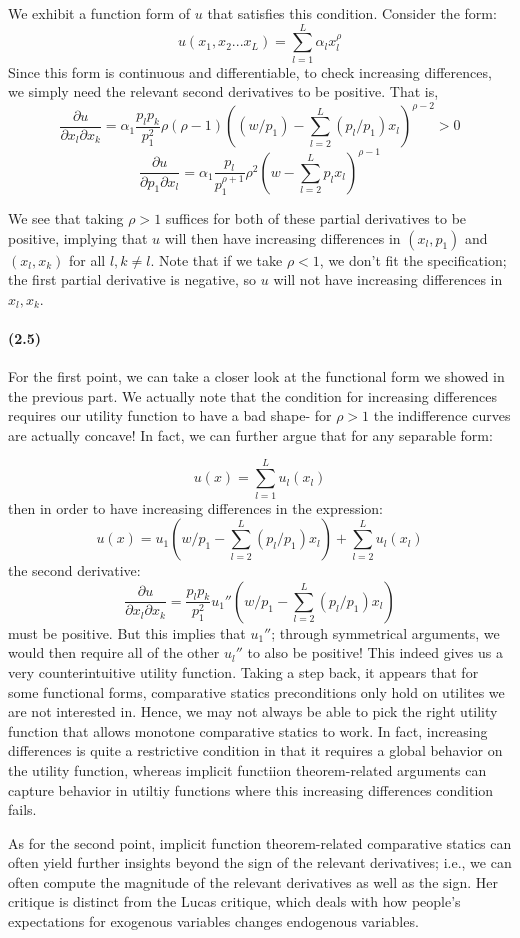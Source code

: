 \documentclass[10pt,letter]{article}
\begin{document}
We exhibit a function form of $u$ that satisfies this condition. Consider the form:
\[ u(x_1, x_2 ... x_L) = \sum_{l=1}^L \alpha_l x_l^\rho \]
Since this form is continuous and differentiable, to check increasing differences, we simply need the relevant second derivatives to be positive. That is,
\[ \frac{\partial u}{\partial x_l \partial x_k} = \alpha_1 \frac{p_lp_k}{p_1^2} \rho(\rho-1) \left( (w/p_1) - \sum_{l=2}^L (p_l/p_1)x_l \right)^{\rho-2} > 0  \]
\[ \frac{\partial u}{\partial p_1 \partial x_l} =  \alpha_1 \frac{p_l}{p_1^{\rho+1}} \rho^2 \left( w - \sum_{l=2}^L p_lx_l \right)^{\rho-1}  \]

We see that taking $\rho > 1$ suffices for both of these partial derivatives to be positive, implying that $u$ will then have increasing differences in $(x_l, p_1)$ and $(x_l, x_k)$ for all $l, k\neq l$. Note that if we take $\rho < 1$, we don't fit the specification; the first partial derivative is negative, so $u$ will not have increasing differences in $x_l, x_k$.

\paragraph{(2.5)}

For the first point, we can take a closer look at the functional form we showed in the previous part. We actually note that the condition for increasing differences requires our utility function to have a bad shape- for $\rho > 1$ the indifference curves are actually concave! In fact, we can further argue that for any separable form:

\[ u(x) = \sum_{l=1}^L u_l(x_l) \]
then in order to have increasing differences in the expression:
\[ u(x) = u_1\left( w/p_1 - \sum_{l=2}^L (p_l/p_1) x_l \right) + \sum_{l=2}^L u_l(x_l) \]
the second derivative:
\[ \frac{\partial u}{\partial x_l \partial x_k} = \frac{p_lp_k}{p_1^2}u_1''\left( w/p_1 - \sum_{l=2}^L (p_l/p_1) x_l \right) \]
must be positive. But this implies that $u_1''$; through symmetrical arguments, we would then require all of the other $u_l''$ to also be positive! This indeed gives us a very counterintuitive utility function. Taking a step back, it appears that for some functional forms, comparative statics preconditions only hold on utilites we are not interested in. Hence, we may not always be able to pick the right utility function that allows monotone comparative statics to work. In fact, increasing differences is quite a restrictive condition in that it requires a global behavior on the utility function, whereas implicit functiion theorem-related arguments can capture behavior in utiltiy functions where this increasing differences condition fails.

As for the second point, implicit function theorem-related comparative statics can often yield further insights beyond the sign of the relevant derivatives; i.e., we can often compute the magnitude of the relevant derivatives as well as the sign. Her critique is distinct from the Lucas critique, which deals with how people's expectations for exogenous variables changes endogenous variables.
\end{document}
